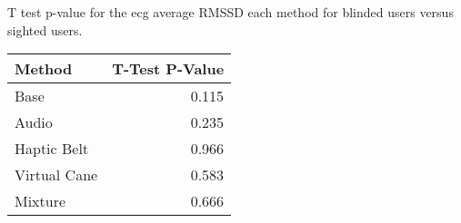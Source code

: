 
\centering
\caption{T test p-value for the ecg average RMSSD each method for blinded users versus sighted users.}
\label{tab:ttest_ecg_rmssd}
\begin{tabular}{lr}
\toprule
      Method &  T-Test P-Value \\
\midrule
        Base &           0.115 \\
       Audio &           0.235 \\
 Haptic Belt &           0.966 \\
Virtual Cane &           0.583 \\
     Mixture &           0.666 \\
\bottomrule
\end{tabular}
